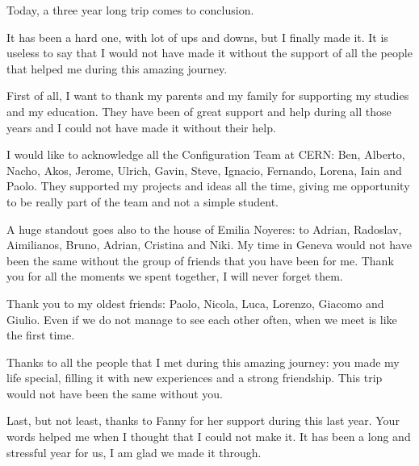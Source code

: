 
\thispagestyle{empty}

Today, a three year long trip comes to conclusion.

It has been a hard one, with lot of ups and downs, but I finally made it.
It is useless to say that I would not have made it without the support of
all the people that helped me during this amazing journey.

First of all, I want to thank my parents and my family for supporting my
studies and my education. They have been of great support and help during
all those years and I could not have made it without their help.

I would like to acknowledge all the Configuration Team at CERN: Ben,
Alberto, Nacho, Akos, Jerome, Ulrich, Gavin, Steve, Ignacio, Fernando,
Lorena, Iain and Paolo. They supported my projects and ideas all the time,
giving me opportunity to be really part of the team and not a simple
student.

A huge standout goes also to the house of Emilia Noyeres: to Adrian,
Radoslav, Aimilianos, Bruno, Adrian, Cristina and Niki. My time in Geneva
would not have been the same without the group of friends that you have
been for me. Thank you for all the moments we spent together, I will never
forget them.

Thank you to my oldest friends: Paolo, Nicola, Luca, Lorenzo, Giacomo and
Giulio. Even if we do not manage to see each other often, when we meet is
like the first time.

Thanks to all the people that I met during this amazing journey: you made
my life special, filling it with new experiences and a strong friendship.
This trip would not have been the same without you.

Last, but not least, thanks to Fanny for her support during this last
year. Your words helped me when I thought that I could not make it. It has
been a long and stressful year for us, I am glad we made it through.
